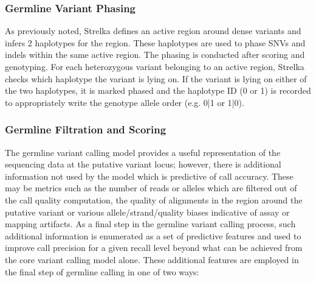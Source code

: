\documentclass{article}
\begin{document}

\subsubsection{Germline Variant Phasing}
As previously noted, Strelka defines an active region around dense variants and infers 2 haplotypes for the region. These haplotypes are used to phase SNVs and indels within the same active region. The phasing is conducted after scoring and genotyping. For each heterozygous variant belonging to an active region, Strelka checks which haplotype the variant is lying on. If the variant is lying on either of the two haplotypes, it is marked phased and the haplotype ID (0 or 1) is recorded to appropriately write the genotype allele order (e.g. 0|1 or 1|0). 

\subsubsection{Germline Filtration and Scoring}

The germline variant calling model provides a useful representation of the sequencing data at the putative variant locus; however, there is additional information not used by the model which is predictive of call accuracy. These may be metrics such as the number of reads or alleles which are filtered out of the call quality computation, the quality of alignments in the region around the putative variant or various allele/strand/quality biases indicative of assay or mapping artifacts. As a final step in the germline variant calling process, such additional information is enumerated as a set of predictive features and used to improve call precision for a given recall level beyond what can be achieved from the core variant calling model alone. These additional features are employed in the final step of germline calling in one of two ways:
\end{document}
